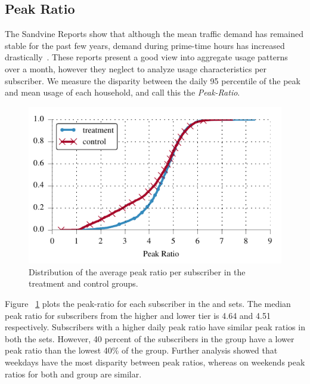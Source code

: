 \subsection{Peak Ratio}\label{subsec:peakratio}

The Sandvine Reports show that although the mean traffic demand has remained
stable for the past few years, demand during prime-time hours has increased
drastically~\cite{sandvine20141h}. These reports present a good view 
into aggregate usage patterns over a month, however they neglect to analyze usage
characteristics per subscriber.
We measure the disparity between the daily 95 percentile of the peak and 
mean usage of each household, and call this the \emph{Peak-Ratio}.

\begin{figure}[t]
\begin{minipage}{1\linewidth}
\centering
\includegraphics[width=1\linewidth]{figures/peakratio_cdf_mean-devices.pdf}
\caption{Distribution of the average peak ratio per subscriber in the treatment and 
control groups.}
\label{fig:CDF-peak-ratio-mean}
\end{minipage}
\end{figure}

Figure ~\ref{fig:CDF-peak-ratio-mean} plots the peak-ratio for each 
subscriber in the \treatment{} and \control{} sets. The median peak
ratio for subscribers from the higher and lower tier is 4.64 and 4.51
respectively. Subscribers with a higher daily peak ratio have similar
peak ratios in both the sets. However, 40 percent of the subscribers
in the \control{} group have a lower peak ratio than the lowest 40\% of
the \treatment{} group. Further analysis showed that weekdays have 
the most disparity between peak ratios, whereas on weekends peak ratios
for both \control{} and \treatment{} group are similar.